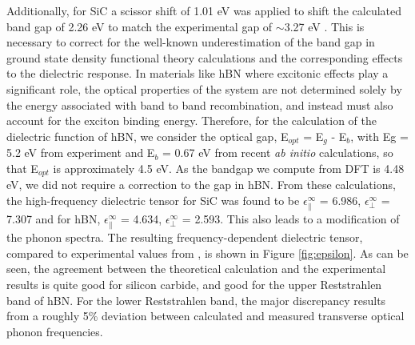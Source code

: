 \documentclass[aps,prb,twocolumn,
	groupedaddress,superscriptaddress,
	amsfonts,amssymb,amsmath,floatfix,
	citeautoscript]{revtex4-1}
\begin{document}
Additionally, for SiC a scissor shift of 1.01 eV was applied to shift the calculated band gap of 2.26 eV to match the experimental gap of $\sim$3.27 eV \cite{band_gap_expt1,band_gap_expt2}. This is necessary to correct for the well-known underestimation of the band gap in ground state density functional theory calculations and the corresponding effects to the dielectric response. In materials like hBN where excitonic effects play a significant role, the optical properties of the system are not determined solely by the energy associated with band to band recombination, and instead must also account for the exciton binding energy\cite{robert2016excitonic}. 
Therefore, for the calculation of the dielectric function of hBN, we consider the optical gap, E$_{opt}$ = E$_g$ - E$_{b}$, with Eg = 5.2 eV from experiment\cite{levinshtein2001properties} and E$_{b}$ = 0.67 eV from recent \emph{ab initio} calculations\cite{attaccalite2018two}, so that E$_{opt}$ is approximately 4.5 eV. As the bandgap we compute from DFT is 4.48 eV, we did not require a correction to the gap in hBN.
From these calculations, the high-frequency dielectric tensor for SiC was found to be $\epsilon^{\infty}_{\parallel}$ = 6.986, $\epsilon^{\infty}_{\perp}$ = 7.307 and for hBN, $\epsilon^{\infty}_{\parallel}$ = 4.634, $\epsilon^{\infty}_{\perp}$ = 2.593.  This also leads to a modification of the phonon spectra. %
The resulting frequency-dependent dielectric tensor, compared to experimental values from \cite{tiwald1999carrier,caldwell2014sub}, is shown in Figure \ref{fig:epsilon}. As can be seen, the agreement between the theoretical calculation and the experimental results is quite good for silicon carbide, and good for the upper Reststrahlen band of hBN. For the lower Reststrahlen band, the major discrepancy results from a roughly 5\% deviation between calculated and measured transverse optical phonon frequencies. 
\end{document}
